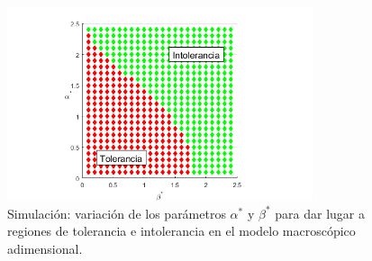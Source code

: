 \begin{figure}[t]
	\centering
	\includegraphics[width=0.8\textwidth]{Imagenes/Simulaciones/macro_toler_intoler}
	\caption{Simulación: variación de los parámetros $\alpha^{*}$ y $\beta^{*}$ para dar lugar a regiones de tolerancia e intolerancia en el modelo macroscópico adimensional.}
	\label{fig:macro_toler_intoler}
\end{figure}